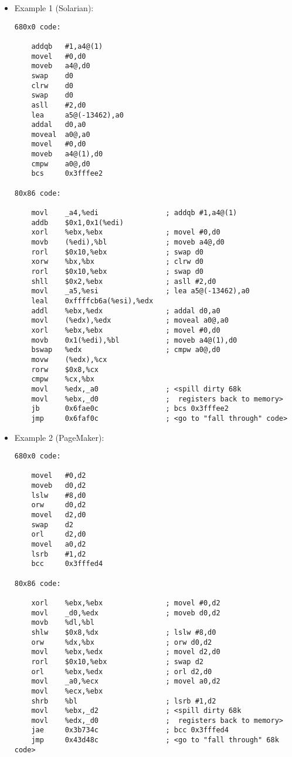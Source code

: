 \begin{itemize}
\item Example 1 (Solarian):

\begin{verbatim}
680x0 code:

	addqb   #1,a4@(1)
	movel   #0,d0
	moveb   a4@,d0
	swap    d0
	clrw    d0
	swap    d0
	asll    #2,d0
	lea     a5@(-13462),a0
	addal   d0,a0
	moveal  a0@,a0
	movel   #0,d0
	moveb   a4@(1),d0
	cmpw    a0@,d0
	bcs     0x3fffee2

80x86 code:

	movl    _a4,%edi                ; addqb #1,a4@(1)
	addb    $0x1,0x1(%edi)
	xorl    %ebx,%ebx               ; movel #0,d0
	movb    (%edi),%bl              ; moveb a4@,d0
	rorl    $0x10,%ebx              ; swap d0
	xorw    %bx,%bx                 ; clrw d0
	rorl    $0x10,%ebx              ; swap d0
	shll    $0x2,%ebx               ; asll #2,d0
	movl    _a5,%esi                ; lea a5@(-13462),a0
	leal    0xffffcb6a(%esi),%edx
	addl    %ebx,%edx               ; addal d0,a0
	movl    (%edx),%edx             ; moveal a0@,a0
	xorl    %ebx,%ebx               ; movel #0,d0
	movb    0x1(%edi),%bl           ; moveb a4@(1),d0
	bswap   %edx                    ; cmpw a0@,d0
	movw    (%edx),%cx
	rorw    $0x8,%cx
	cmpw    %cx,%bx
	movl    %edx,_a0                ; <spill dirty 68k
	movl    %ebx,_d0                ;  registers back to memory>
	jb      0x6fae0c                ; bcs 0x3fffee2
	jmp     0x6faf0c                ; <go to "fall through" code>
\end{verbatim}
\item Example 2 (PageMaker):

\begin{verbatim}
680x0 code:

	movel   #0,d2
	moveb   d0,d2
	lslw    #8,d0
	orw     d0,d2
	movel   d2,d0
	swap    d2
	orl     d2,d0
	movel   a0,d2
	lsrb    #1,d2
	bcc     0x3fffed4

80x86 code:

	xorl    %ebx,%ebx               ; movel #0,d2
	movl    _d0,%edx                ; moveb d0,d2
	movb    %dl,%bl
	shlw    $0x8,%dx                ; lslw #8,d0
	orw     %dx,%bx                 ; orw d0,d2
	movl    %ebx,%edx               ; movel d2,d0
	rorl    $0x10,%ebx              ; swap d2
	orl     %ebx,%edx               ; orl d2,d0
	movl    _a0,%ecx                ; movel a0,d2
	movl    %ecx,%ebx
	shrb    %bl                     ; lsrb #1,d2
	movl    %ebx,_d2                ; <spill dirty 68k
	movl    %edx,_d0                ;  registers back to memory>
	jae     0x3b734c                ; bcc 0x3fffed4
	jmp     0x43d48c                ; <go to "fall through" 68k code>
\end{verbatim}
\end{itemize}
